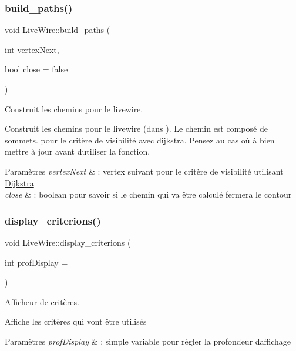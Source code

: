 \subsubsection{\texorpdfstring{build\+\_\+paths()}{build\_paths()}}
{\footnotesize\ttfamily void Live\+Wire\+::build\+\_\+paths (\begin{DoxyParamCaption}\item[{int}]{vertex\+Next,  }\item[{bool}]{close = {\ttfamily false} }\end{DoxyParamCaption})}



Construit les chemins pour le livewire. 

Construit les chemins pour le livewire (dans ). Le chemin est composé de sommets.  pour le critère de visibilité avec dijkstra. Pensez au cas où à bien mettre à jour  avant d\textquotesingle{}utiliser la fonction.


\begin{DoxyParams}{Paramètres}
{\em vertex\+Next} & \+: vertex suivant pour le critère de visibilité utilisant \hyperlink{classDijkstra}{Dijkstra} \\
\hline
{\em close} & \+: boolean pour savoir si le chemin qui va être calculé fermera le contour \\
\hline
\end{DoxyParams}
\mbox{\label{classLiveWire_a6c6ced430d7fd80faeb4ba03c8553642}} 
\subsubsection{\texorpdfstring{display\+\_\+criterions()}{display\_criterions()}}
{\footnotesize\ttfamily void Live\+Wire\+::display\+\_\+criterions (\begin{DoxyParamCaption}\item[{int}]{prof\+Display = {} }\end{DoxyParamCaption})}



Afficheur de critères. 

Affiche les critères qui vont être utilisés


\begin{DoxyParams}{Paramètres}
{\em prof\+Display} & \+: simple variable pour régler la profondeur d\textquotesingle{}affichage \\
\hline
\end{DoxyParams}
\mbox{\label{classLiveWire_ad5f6d3ed25f17e9ef59dcab06436fbf5}} 
